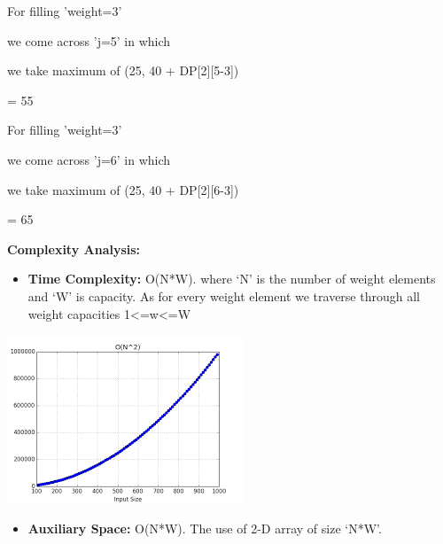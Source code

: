 \documentclass[letterpaper]{article}
\newcommand\liststyleWWNumii{%
\renewcommand\labelitemi{\ding{108}}
\renewcommand\labelitemii{{\BigCircle}}
\renewcommand\labelitemiii{\ding{110}}
\renewcommand\labelitemiv{\ding{108}}
}
\begin{document}
\begin{multicols}{2}
\bigskip

For filling 'weight=3' 

we come across 'j=5' in which 

we take maximum of (25, 40 + DP[2][5-3])

= 55


\bigskip

For filling 'weight=3' 

we come across 'j=6' in which 

we take maximum of (25, 40 + DP[2][6-3])

= 65

\textbf{\textcolor[rgb]{0.2509804,0.25882354,0.30588236}{Complexity
Analysis:}}\textcolor[rgb]{0.2509804,0.25882354,0.30588236}{ }

\liststyleWWNumii
\begin{itemize}
\item \textbf{\textcolor[rgb]{0.2509804,0.25882354,0.30588236}{Time
Complexity:}}\textcolor[rgb]{0.2509804,0.25882354,0.30588236}{ O(N*W). \newline
where `N' is the number of weight elements and `W' is capacity. As for every weight element we traverse through all
weight capacities 1{\textless}=w{\textless}=W}
\end{itemize}

\bigskip
\includegraphics[scale=1.0]{complexity}

\bigskip

\liststyleWWNumii
\begin{itemize}
\item \textbf{\textcolor[rgb]{0.2509804,0.25882354,0.30588236}{Auxiliary
Space:}}\textcolor[rgb]{0.2509804,0.25882354,0.30588236}{ O(N*W). \newline
The use of 2-D array of size `N*W'.}
\end{itemize}
\end{multicols}
\end{document}
